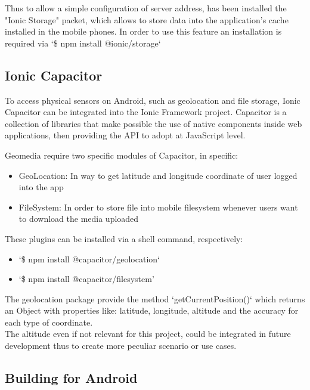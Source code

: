 \documentclass[conference]{IEEEtran}
\begin{document}
Thus to allow a simple configuration of server address, has been installed the "Ionic Storage" \cite{b9} packet, which allows to store data into the application's cache installed in the mobile phones. In order to use this feature an installation is required via `\$ npm install @ionic/storage`









\subsection{Ionic Capacitor}

To access physical sensors on Android, such as geolocation and file storage, Ionic Capacitor\cite{b10} can be integrated into the Ionic Framework project. Capacitor is a collection of libraries that make possible the use of native components inside web applications, then providing the API to adopt at JavaScript level.

Geomedia require two specific modules of Capacitor, in specific:
\begin{itemize}
    \item GeoLocation\cite{b2}: In way to get latitude and longitude coordinate of user logged into the app
    \item FileSystem\cite{b3}: In order to store file into mobile filesystem whenever users want to download the media uploaded
\end{itemize}

These plugins can be installed via a shell command, respectively:
\begin{itemize}
    \item `\$ npm install @capacitor/geolocation`
    \item `\$ npm install @capacitor/filesystem'
\end{itemize}

The geolocation package provide the method `getCurrentPosition()` which returns an Object with properties like: latitude, longitude, altitude and the accuracy for each type of coordinate. 
\\
The altitude even if not relevant for this project, could be integrated in future development thus to create more peculiar scenario or use cases.


\subsection{Building for Android}
\end{document}
